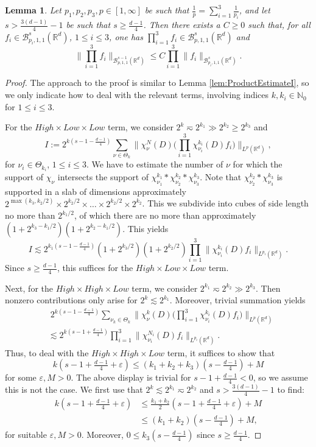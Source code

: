 \documentclass{amsart}
\newtheorem{lemma}[theorem]{Lemma}
\theoremstyle{definition}
\newcommand{\R}{\mathbb{R}}
\newcommand{\N}{\mathbb{N}}
\newcommand {\Rd}{\mathbb{R}^{d}}
\newcommand {\Ba}{\mathcal{B}}
\newcommand {\veps}{\varepsilon}
\numberwithin{equation}{section}
\begin{document}
\begin{lemma}\label{lem:TrilinearEstimate}
Let $p_{1},p_{2},p_{3},p\in[1,\infty]$ be such that $\frac{1}{p}=\sum_{i=1}^{3}\frac{1}{p_{i}}$, and let $s>\frac{3(d-1)}{4}-1$ be such that $s\geq \frac{d-1}{4}$. Then there exists a $C\geq0$ such that, for all $f_{i}\in \Ba^{s}_{p_{i},1,1}(\Rd)$, $1\leq i\leq 3$, one has $\prod_{i=1}^{3}f_{i}\in \Ba^{s}_{p,1,1}(\Rd)$ and
\[
\Big\| \prod_{i=1}^3 f_i \Big\|_{\mathcal{B}^{s-1}_{p,1,1}(\R^d)} \leq C\prod_{i=1}^3 \| f_i \|_{\mathcal{B}^s_{p_i,1,1}(\R^d)}.
\]
\end{lemma}
\begin{proof}
The approach to the proof is similar to Lemma \ref{lem:ProductEstimateI}, so we only indicate how to deal with the relevant terms, involving indices $k,k_{i}\in\N_{0}$ for $1\leq i\leq 3$. 

For the $High \times Low \times Low$ term, we consider $2^k \eqsim 2^{k_1} \gg 2^{k_{2}} \geq 2^{k_3}$ and
\[
I:=2^{k(s-1-\frac{d-1}{4})}\sum_{\nu\in\Theta_{k}}\Big\| \chi^N_\nu(D) \Big(\prod_{i=1}^{3}\chi_{\nu_{i}} ^{k_{i}}(D)f_{i}\Big)\Big\|_{L^{p}(\Rd)},
\]
for $\nu_{i}\in\Theta_{k_{i}}$, $1\leq i\leq 3$. We have to estimate the number of $\nu$ for which the support of $\chi_{\nu}$ intersects the support of $\chi^{k_1}_{\nu_{1}} * \chi^{k_2}_{\nu_2} * \chi^{k_3}_{\nu_3}$. Note that $\chi^{k_2}_{\nu_2}* \chi^{k_3}_{\nu_3}$ is supported in a slab of dimensions approximately $2^{\max(k_3,k_2/2)} \times 2^{k_2/2}\times \ldots \times 2^{k_2/2} \times 2^{k_2}$. This we subdivide into cubes of side length no more than $2^{k_1/2}$, of which there are no more than approximately $(1+2^{k_3-k_{1}/2})(1+ 2^{k_2-k_{1}/2})$. This yields
\[
I\lesssim 2^{k_{1}(s-1-\frac{d-1}{4})} (1+2^{k_3/2})(1+ 2^{k_2/2}) \prod_{i=1}^3  \| \chi^{k_i}_{\nu_i}(D) f_i \|_{L^{p_i}(\Rd)}.
\]
Since $s\geq \frac{d-1}{4}$, this suffices for the $High \times Low \times Low$ term.

Next, for the $High \times High \times Low$ term, we consider $2^{k_1} \eqsim 2^{k_2} \gg 2^{k_3}$. Then nonzero contributions only arise for $2^{k}\lesssim 2^{k_{1}}$. Moreover, trivial summation yields
\begin{align*}
&\;2^{k(s-1-\frac{d-1}{4})}\sum_{\nu_{k}\in\Theta_{k}} \Big\| \chi^k_\nu(D) \Big(\prod_{i=1}^3 \chi^{k_i}_{\nu_i}(D) f_i \Big) \Big\|_{L^p(\Rd)}\\
& \lesssim 2^{k(s-1+\frac{d-1}{4})} \prod_{i=1}^3 \| \chi^{N_i}_{\nu_i}(D) f_i \|_{L^{p_i}(\Rd)}.
\end{align*}
Thus, to deal with the $High \times High \times Low$ term, it suffices to show that
\[
k(s-1+\tfrac{d-1}{4}+\veps)\leq   (k_{1}+k_{2}+k_{3})(s-\tfrac{d-1}{4})+M
\]
for some $\veps,M>0$. The above display is trivial for $s-1 + \frac{d-1}{4} < 0$, so we assume this is not the case. We first use that $2^{k}\lesssim 2^{k_{1}}\eqsim 2^{k_{2}}$ and $s>\frac{3(d-1)}{4}-1$ to find:
\begin{align*}
k(s-1+\tfrac{d-1}{4}+\veps)&\leq \tfrac{k_{1}+k_{2}}{2}(s-1+\tfrac{d-1}{4}+\veps)+M\\
&\leq (k_{1}+k_{2})(s-\tfrac{d-1}{4})+M,
\end{align*}
for suitable $\veps,M>0$. Moreover, $0\leq k_{3}(s-\frac{d-1}{4})$ since $s\geq \frac{d-1}{4}$.


\end{proof}
\end{document}
